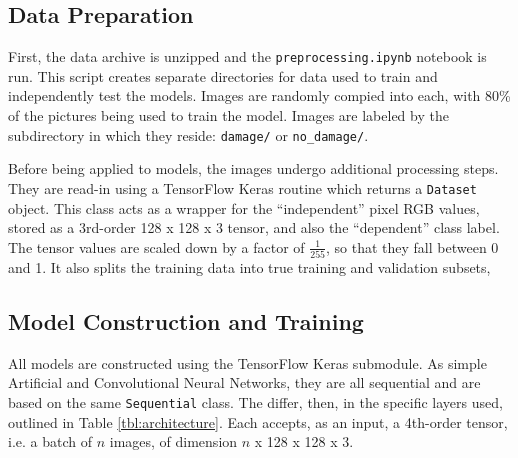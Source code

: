 \documentclass{article}
\begin{document}
\subsection{Data Preparation}

First, the data archive is unzipped and the \verb|preprocessing.ipynb| notebook is run. This script creates separate directories for data used to train and independently test the models. Images are randomly compied into each, with 80\% of the pictures being used to train the model. Images are labeled by the subdirectory in which they reside: \verb|damage/| or \verb|no_damage/|.

Before being applied to models, the images undergo additional processing steps. They are read-in using a TensorFlow Keras routine which returns a \verb|Dataset| object. This class acts as a wrapper for the ``independent'' pixel RGB values, stored as a 3rd-order 128 x 128 x 3 tensor, and also the ``dependent'' class label. The tensor values are scaled down by a factor of $\frac{1}{255}$, so that they fall between 0 and 1. It also splits the training data into true training and validation subsets, 

\subsection{Model Construction and Training}

All models are constructed using the TensorFlow Keras submodule. As simple Artificial and Convolutional Neural Networks, they are all sequential and are based on the same \verb|Sequential| class. The differ, then, in the specific layers used, outlined in Table \ref{tbl:architecture}. Each accepts, as an input, a 4th-order tensor, i.e. a batch of $n$ images, of dimension $n$ x 128 x 128 x 3.
\end{document}
